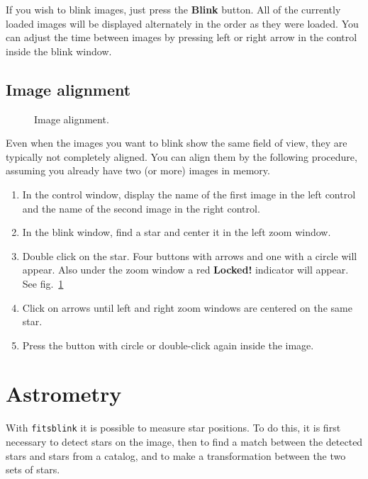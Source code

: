 \documentclass[11pt]{article}
\begin{document}
If you wish to blink images, just press the \textbf{Blink} button.
All of the currently loaded images will be displayed alternately in
the order as they were loaded.  You can adjust the time between images
by pressing left or right arrow in the control inside the blink
window.

\subsection{Image alignment}

\begin{figure}[h]
\begin{center}
\epsfxsize=12cm
\caption{Image alignment.}
\label{locked}
\end{center}
\end{figure}

Even when the images you want to blink show the same field of view,
they are typically not completely aligned.  You can align them by the
following procedure, assuming you already have two (or more) images in
memory.

\begin{enumerate}
\item In the control window, display the name of the first image in
the left control and the name of the second image in the right
control.  
\item In the blink window, find a star and center it in the left zoom
window.
\item Double click on the star.  Four buttons with arrows and one with
a circle will appear.  Also under the zoom window a red
\textbf{Locked!}  indicator will appear. See fig.~\ref{locked}
\item Click on arrows until left and right zoom windows are centered
on the same star.
\item Press the button with circle or double-click again inside the image.
\end{enumerate}


\section{Astrometry}

With \verb=fitsblink= it is possible to measure star positions.  To do
this, it is first necessary to detect stars on the image, then to find
a match between the detected stars and stars from a catalog, and to
make a transformation between the two sets of stars.
\end{document}
